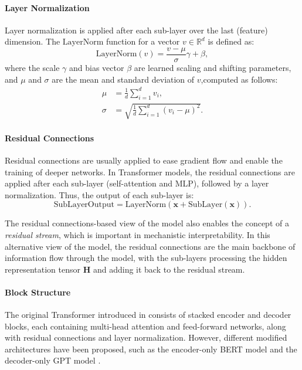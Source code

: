 \paragraph{Layer Normalization}

Layer normalization \parencite{ba_layer_2016} is applied after each sub-layer over the last (feature) dimension. The $\text{LayerNorm}$ function for a vector $v \in \mathbb{R}^d$ is defined as:
\begin{equation*}
    \text{LayerNorm}(v) = \frac{v - \mu}{\sigma}\gamma + \beta,
\end{equation*}
where the scale $\gamma$ and bias vector $\beta$ are learned scaling and shifting parameters, and $\mu$ and $\sigma$ are the mean and standard deviation of $v$,computed as follows:
\begin{align*}
    \mu    & = \frac{1}{d} \sum_{i=1}^{d} v_i,                  \\
    \sigma & = \sqrt{\frac{1}{d} \sum_{i=1}^{d} (v_i - \mu)^2}.
\end{align*}

\paragraph{Residual Connections}

Residual connections \parencite{he_deep_2016} are usually applied to ease gradient flow and enable the training of deeper networks. In Transformer models, the residual connections are applied after each sub-layer (self-attention and MLP), followed by a layer normalization. Thus, the output of each sub-layer is:
\begin{equation*}
    \text{SubLayerOutput} = \text{LayerNorm}(\mathbf{x} + \text{SubLayer}(\mathbf{x})).
\end{equation*}

The residual connections-based view of the model also enables the concept of a \emph{residual stream}, which is important in mechanistic interpretability. In this alternative view of the model, the residual connections are the main backbone of information flow through the model, with the sub-layers processing the hidden representation tensor $\mathbf{H}$ and adding it back to the residual stream.

\paragraph{Block Structure}

The original Transformer introduced in \cite{vaswani_attention_2017} consists of stacked encoder and decoder blocks, each containing multi-head attention and feed-forward networks, along with residual connections and layer normalization. However, different modified architectures have been proposed, such as the encoder-only BERT model \parencite{devlin_bert_2019} and the decoder-only GPT model \parencite{radford_improving_2018}.

